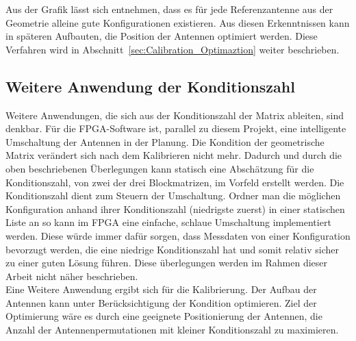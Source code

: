 %
Aus der Grafik lässt sich entnehmen, dass es für jede Referenzantenne aus der Geometrie alleine gute Konfigurationen existieren. Aus diesen Erkenntnissen kann in späteren Aufbauten, die Position der Antennen optimiert werden. Diese Verfahren wird in Abschnitt~\ref{sec:Calibration_Optimaztion} weiter beschrieben.
%
\subsection{Weitere Anwendung der Konditionszahl}
Weitere Anwendungen, die sich aus der Konditionszahl der Matrix ableiten, sind denkbar. Für die FPGA-Software ist, parallel zu diesem Projekt, eine intelligente Umschaltung der Antennen in der Planung. Die Kondition der geometrische Matrix verändert sich nach dem Kalibrieren nicht mehr. Dadurch und durch die oben beschriebenen Überlegungen kann statisch eine Abschätzung für die Konditionszahl, von zwei der drei Blockmatrizen, im Vorfeld erstellt werden. Die Konditionszahl dient zum Steuern der Umschaltung. Ordner man die möglichen Konfiguration anhand ihrer Konditionszahl (niedrigste zuerst) in einer statischen Liste an so kann im FPGA eine einfache, schlaue Umschaltung implementiert werden. Diese würde immer dafür sorgen, dass Messdaten von einer Konfiguration bevorzugt werden, die eine niedrige Konditionszahl hat und somit relativ sicher zu einer guten Lösung führen. Diese überlegungen werden im Rahmen dieser Arbeit nicht näher beschrieben.\\
Eine Weitere Anwendung ergibt sich für die Kalibrierung. Der Aufbau der Antennen kann unter Berücksichtigung der Kondition optimieren. Ziel der Optimierung wäre es durch eine geeignete Positionierung der Antennen, die Anzahl der Antennenpermutationen mit kleiner Konditionszahl zu maximieren.